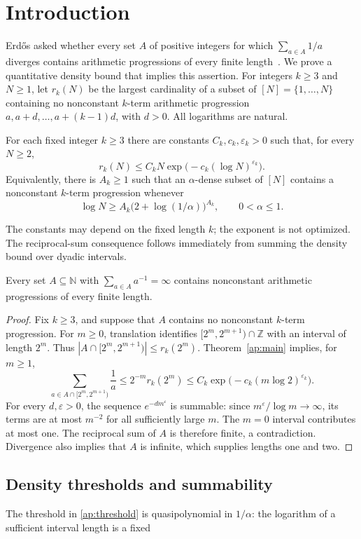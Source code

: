 \section{Introduction}\label{ap:introduction}

Erd\H{o}s asked whether every set $A$ of positive integers for which
$\sum_{a\in A}1/a$ diverges contains arithmetic progressions of every
finite length~\cite[Problem~4.33.6]{Erdos1974}.
We prove a quantitative density bound that implies this assertion.
For integers $k\ge3$ and $N\ge1$, let $r_k(N)$ be the largest
cardinality of a subset of $[N]=\{1,\ldots,N\}$ containing no
nonconstant $k$-term arithmetic progression
$a,a+d,\ldots,a+(k-1)d$, with $d>0$.
All logarithms are natural.

\begin{theorem}\label{ap:main}
For each fixed integer $k\ge3$ there are constants
$C_k,c_k,\varepsilon_k>0$ such that, for every $N\ge2$,
\begin{equation}\label{ap:density-bound}
 r_k(N)\le C_kN\exp\bigl(-c_k(\log N)^{\varepsilon_k}\bigr).
\end{equation}
Equivalently, there is $A_k\ge1$ such that an $\alpha$-dense subset
of $[N]$ contains a nonconstant $k$-term progression whenever
\begin{equation}\label{ap:threshold}
 \log N\ge A_k\bigl(2+\log(1/\alpha)\bigr)^{A_k},
 \qquad 0<\alpha\le1.
\end{equation}
\end{theorem}


The constants may depend on the fixed length $k$; the exponent is
not optimized. The reciprocal-sum consequence follows immediately
from summing the density bound over dyadic intervals.

\begin{corollary}\label{ap:reciprocal}
Every set $A\subseteq\mathbb N$ with
$\sum_{a\in A}a^{-1}=\infty$ contains nonconstant arithmetic
progressions of every finite length.
\end{corollary}

\begin{proof}
Fix $k\ge3$, and suppose that $A$ contains no nonconstant
$k$-term progression. For $m\ge0$, translation identifies
$[2^m,2^{m+1})\cap\mathbb Z$ with an interval of length $2^m$.
Thus $|A\cap[2^m,2^{m+1})|\le r_k(2^m)$. Theorem~\ref{ap:main}
implies, for $m\ge1$,
\[
 \sum_{a\in A\cap[2^m,2^{m+1})}\frac1a
 \le 2^{-m}r_k(2^m)
 \le C_k\exp\bigl(-c_k(m\log2)^{\varepsilon_k}\bigr).
\]
For every $d,\varepsilon>0$, the sequence $e^{-dm^\varepsilon}$
is summable: since $m^\varepsilon/\log m\to\infty$, its terms
are at most $m^{-2}$ for all sufficiently large $m$.
The $m=0$ interval contributes at most one. The reciprocal sum of
$A$ is therefore finite, a contradiction. Divergence also implies
that $A$ is infinite, which supplies lengths one and two.
\end{proof}

\subsection{Density thresholds and summability}

The threshold in \eqref{ap:threshold} is quasipolynomial in
$1/\alpha$: the logarithm of a sufficient interval length is a fixed
